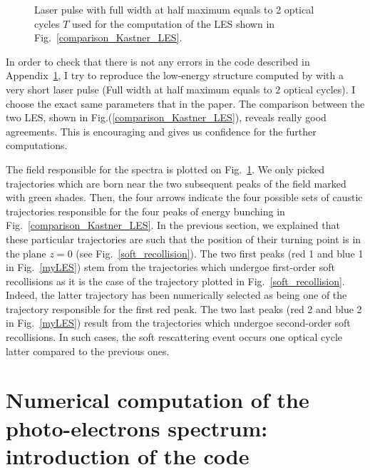 \documentclass[a4paper]{article}
\begin{document}
\begin{figure}[htp]
 \resizebox{1\textwidth}{!}{}
 \caption{Laser pulse with full width at half maximum equals to 2 optical cycles $T$ used for the computation of the LES shown in Fig.~\ref{comparison_Kastner_LES}. }
\label{laser_pulse}
\end{figure}

In order to check that there is not any errors in the code described in Appendix~\ref{code}, I try to reproduce the low-energy structure computed by \cite{Kastner_2012_pulse} with a very short laser pulse (Full width at half maximum equals to $2$ optical cycles). I choose the exact same parameters that in the paper. The comparison between the two LES, shown in Fig.(\ref{comparison_Kastner_LES}), reveals really good agreements. This is encouraging and gives us confidence for the further computations.
\par
The field responsible for the spectra is plotted on Fig.~\ref{laser_pulse}. We only picked trajectories which are born near the two subsequent peaks of the field marked with green shades. Then, the four arrows indicate the four possible sets of caustic trajectories responsible for the four peaks of energy bunching in Fig.~\ref{comparison_Kastner_LES}. In the previous section, we explained that these particular trajectories are such that the position of their turning point is in the plane $z=0$ (see Fig.~\ref{soft_recollision}). The two first peaks (red 1 and blue 1 in Fig.~\ref{myLES}) stem from the trajectories which undergoe first-order soft recollisions \cite{Kastner_2012_pulse} as it is the case of the trajectory plotted in Fig.~\ref{soft_recollision}. Indeed, the latter trajectory has been numerically selected as being one of the trajectory responsible for the first red peak. 
The two last peaks (red 2 and blue 2 in Fig.~\ref{myLES}) result from the trajectories which undergoe second-order soft recollisions. In such cases, the soft rescattering event occurs one optical cycle latter compared to the previous ones.




\newpage
\appendix

\section{Numerical computation of the photo-electrons spectrum: introduction of the code}
\label{code}
\end{document}
